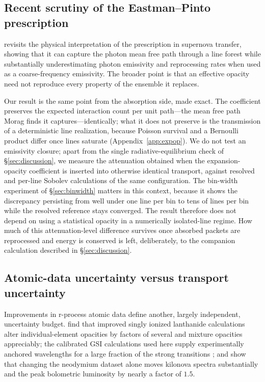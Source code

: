 \documentclass[fleqn,usenatbib]{mnras}
\begin{document}
\subsection{Recent scrutiny of the Eastman--Pinto prescription}

\citet{morag2026} revisits the physical interpretation of the
\citet{eastman1993} prescription in supernova transfer, showing that it can
capture the photon mean free path through a line forest while substantially
underestimating photon emissivity and reprocessing rates when used as a
coarse-frequency emissivity. The broader point is that an effective opacity
need not reproduce every property of the ensemble it replaces.

Our result is the same point from the absorption side, made exact. The
coefficient preserves the expected interaction count per unit path---the
mean free path Morag finds it captures---identically; what it does not
preserve is the transmission of a deterministic line realization, because
Poisson survival and a Bernoulli product differ once lines saturate
(Appendix~\ref{app:expop}). We do not test an emissivity closure; apart from
the single radiative-equilibrium check of \S\ref{sec:discussion}, we measure
the attenuation obtained when the expansion-opacity coefficient is inserted
into otherwise identical transport, against resolved and per-line Sobolev
calculations of the same configuration. The bin-width experiment of
\S\ref{sec:binwidth} matters in this context, because it shows the
discrepancy persisting from well under one line per bin to tens of lines per
bin while the resolved reference stays converged. The result therefore does
not depend on using a statistical opacity in a numerically isolated-line
regime. How much of this attenuation-level difference survives once absorbed
packets are reprocessed and energy is conserved is left, deliberately, to the
companion calculation described in \S\ref{sec:discussion}.

\subsection{Atomic-data uncertainty versus transport uncertainty}

Improvements in r-process atomic data define another, largely independent,
uncertainty budget. \citet{kato2024} find that improved singly ionized
lanthanide calculations alter individual-element opacities by factors of
several and mixture opacities appreciably; the calibrated GSI calculations
used here supply experimentally anchored wavelengths for a large fraction of
the strong transitions \citep{gsi_atomic}; and \citet{fontes2026} show that
changing the neodymium dataset alone moves kilonova spectra substantially and
the peak bolometric luminosity by nearly a factor of $1.5$.
\end{document}
